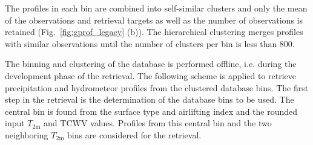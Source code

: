 \documentclass[journal abbreviation, manuscript]{copernicus}
\begin{document}
The profiles in each  bin are combined into self-similar clusters and only
the mean of the observations and retrieval targets as well as the number of
observations is retained (Fig.~\ref{fig:gprof_legacy} (b)). The hierarchical
clustering merges profiles with similar observations until the number of clusters
per bin is less than 800.

The binning and clustering of the database is performed offline, i.e. during the
development phase of the retrieval. The following scheme is applied to retrieve
precipitation and hydrometeor profiles from the clustered database bins. The
first step in the retrieval is the determination of the database bins to be
used. The central bin is found from the surface type and airlifting index and
the rounded input $T_\text{2m}$ and $\text{TCWV}$ values. Profiles from this
central bin and the two neighboring $T_\text{2m}$ bins are considered for the
retrieval.
\end{document}
